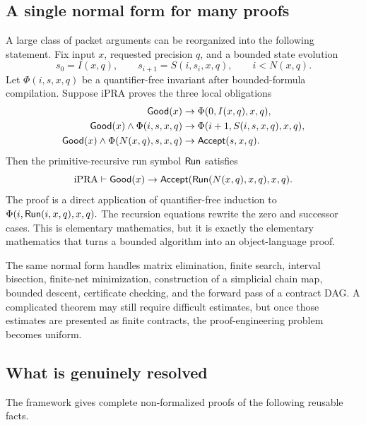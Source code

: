 \subsection{A single normal form for many proofs}

A large class of packet arguments can be reorganized into the following statement. Fix input \(x\), requested precision \(q\), and a bounded state evolution
\[
  s_0=I(x,q),\qquad s_{i+1}=S(i,s_i,x,q),\qquad i<N(x,q).
\]
Let \(\Phi(i,s,x,q)\) be a quantifier-free invariant after bounded-formula compilation. Suppose iPRA proves the three local obligations
\begin{align*}
  \mathsf{Good}(x)&\to \Phi(0,I(x,q),x,q),\\
  \mathsf{Good}(x)\wedge \Phi(i,s,x,q)&\to \Phi(i+1,S(i,s,x,q),x,q),\\
  \mathsf{Good}(x)\wedge \Phi(N(x,q),s,x,q)&\to \mathsf{Accept}(s,x,q).
\end{align*}
Then the primitive-recursive run symbol \(\mathsf{Run}\) satisfies
\[
  \mathrm{iPRA}\vdash \mathsf{Good}(x)\to
  \mathsf{Accept}(\mathsf{Run}(N(x,q),x,q),x,q).
\]
The proof is a direct application of quantifier-free induction to
\(
  \Phi(i,\mathsf{Run}(i,x,q),x,q).
\)
The recursion equations rewrite the zero and successor cases. This is elementary mathematics, but it is exactly the elementary mathematics that turns a bounded algorithm into an object-language proof.

The same normal form handles matrix elimination, finite search, interval bisection, finite-net minimization, construction of a simplicial chain map, bounded descent, certificate checking, and the forward pass of a contract DAG. A complicated theorem may still require difficult estimates, but once those estimates are presented as finite contracts, the proof-engineering problem becomes uniform.

\subsection{What is genuinely resolved}

The framework gives complete non-formalized proofs of the following reusable facts.

